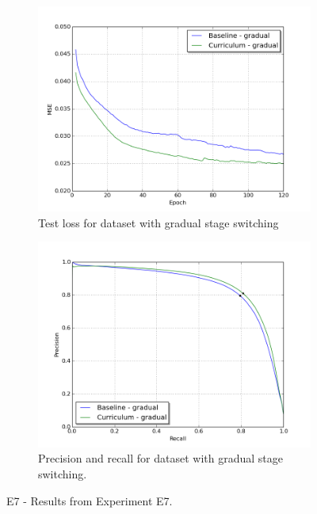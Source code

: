 \begin{figure}
\begin{subfigure}{0.48\textwidth}
\includegraphics[width=\linewidth]{figs/E7/E7_lc_gradual.png}
\caption{Test loss for dataset with gradual stage switching} \label{fig:E7_gradual_loss}
\end{subfigure}
\hspace*{\fill} %
\begin{subfigure}{0.48\textwidth}
\includegraphics[width=\linewidth]{figs/E7/E7_pr_gradual.png}
\caption{Precision and recall for dataset with gradual stage switching.} \label{fig:E7_gradual_pr}
\end{subfigure}
\hspace*{\fill} %
\caption{E7 - Results from Experiment E7.} \label{fig:E7_curriculum_inexperienced}
\end{figure}

